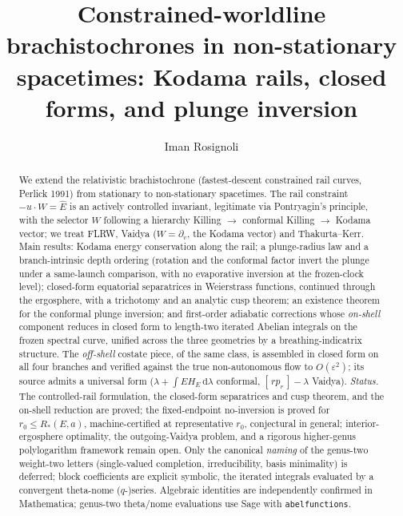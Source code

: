 \documentclass[12pt]{iopart}
\newcommand{\Ehat}{\hat E}
\newcommand{\dd}{\mathrm{d}}
\begin{document}
\title{Constrained-worldline brachistochrones in non-stationary
spacetimes: Kodama rails, closed forms, and plunge inversion}

\author{Iman Rosignoli}
\address{University of Pavia, Pavia, Italy}

\begin{abstract}
We extend the relativistic brachistochrone (fastest-descent constrained rail
curves, Perlick 1991) from stationary to non-stationary spacetimes. The rail
constraint $-u\cdot W=\Ehat$ is an actively controlled invariant, legitimate via
Pontryagin's principle, with the selector $W$ following a hierarchy Killing $\to$
conformal Killing $\to$ Kodama vector; we treat FLRW, Vaidya ($W=\partial_v$, the
Kodama vector) and Thakurta--Kerr. Main results: Kodama energy conservation along
the rail; a plunge-radius law and a branch-intrinsic depth ordering (rotation and
the conformal factor invert the plunge under a same-launch comparison, with no
evaporative inversion at the frozen-clock level); closed-form equatorial
separatrices in Weierstrass functions, continued through the ergosphere, with a
trichotomy and an analytic cusp theorem; an existence theorem for the conformal
plunge inversion; and first-order adiabatic corrections whose \emph{on-shell}
component reduces in closed form to length-two iterated Abelian integrals on the
frozen spectral curve, unified across the three geometries by a breathing-indicatrix
structure. The \emph{off-shell} costate piece, of the same class, is assembled in
closed form on all four branches and verified against the true non-autonomous flow
to $O(\varepsilon^2)$; its source admits a universal form
($\lambda+\int E H_E\,\dd\lambda$ conformal, $[\,rp_r\,]-\lambda$ Vaidya).
\emph{Status.} The controlled-rail formulation, the closed-form separatrices and
cusp theorem, and the on-shell reduction are proved; the fixed-endpoint no-inversion
is proved for $r_0\le R_\ast(E,a)$, machine-certified at representative $r_0$,
conjectural in general; interior-ergosphere optimality, the outgoing-Vaidya problem,
and a rigorous higher-genus polylogarithm framework remain open. Only the canonical
\emph{naming} of the genus-two weight-two letters (single-valued completion,
irreducibility, basis minimality) is deferred; block coefficients are explicit
symbolic, the iterated integrals evaluated by a convergent theta-nome ($q$-)series.
Algebraic identities are independently confirmed in Mathematica; genus-two
theta/nome evaluations use Sage with \texttt{abelfunctions}.
\end{abstract}
\end{document}
